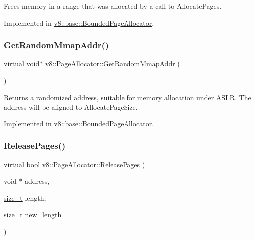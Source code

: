 Frees memory in a range that was allocated by a call to Allocate\+Pages. 

Implemented in \mbox{\hyperlink{classv8_1_1base_1_1BoundedPageAllocator_a52bf55c7bd934bd67982d37691c15573}{v8\+::base\+::\+Bounded\+Page\+Allocator}}.

\mbox{\label{classv8_1_1PageAllocator_a37f194f9c5fdbe5105476cbd1432418c}} 
\subsubsection{\texorpdfstring{Get\+Random\+Mmap\+Addr()}{GetRandomMmapAddr()}}
{\footnotesize\ttfamily virtual void$\ast$ v8\+::\+Page\+Allocator\+::\+Get\+Random\+Mmap\+Addr (\begin{DoxyParamCaption}{ }\end{DoxyParamCaption})\hspace{0.3cm}{\ttfamily [pure virtual]}}

Returns a randomized address, suitable for memory allocation under A\+S\+LR. The address will be aligned to Allocate\+Page\+Size. 

Implemented in \mbox{\hyperlink{classv8_1_1base_1_1BoundedPageAllocator_aafb1cb9ac6fed20bdba0806a46f28bfc}{v8\+::base\+::\+Bounded\+Page\+Allocator}}.

\mbox{\label{classv8_1_1PageAllocator_a6eb6bd93c8880dd022a61a13c65f66c0}} 
\subsubsection{\texorpdfstring{Release\+Pages()}{ReleasePages()}}
{\footnotesize\ttfamily virtual \mbox{\hyperlink{classbool}{bool}} v8\+::\+Page\+Allocator\+::\+Release\+Pages (\begin{DoxyParamCaption}\item[{void $\ast$}]{address,  }\item[{\mbox{\hyperlink{classsize__t}{size\+\_\+t}}}]{length,  }\item[{\mbox{\hyperlink{classsize__t}{size\+\_\+t}}}]{new\+\_\+length }\end{DoxyParamCaption})\hspace{0.3cm}{\ttfamily [pure virtual]}}

